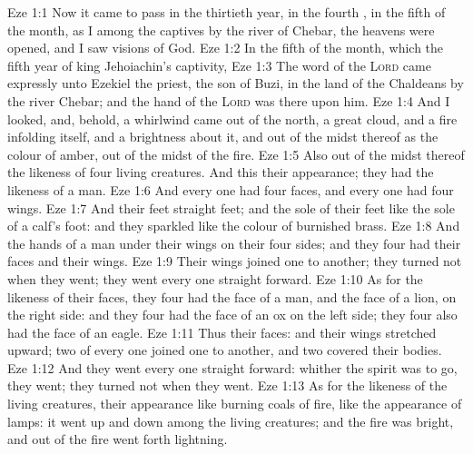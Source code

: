 \vs Eze 1:1 Now it came to pass in the thirtieth year, in the fourth , in the fifth  of the month, as I  among the captives by the river of Chebar,  the heavens were opened, and I saw visions of God.
\vs Eze 1:2 In the fifth  of the month, which  the fifth year of king Jehoiachin's captivity,
\vs Eze 1:3 The word of the \textsc{Lord} came expressly unto Ezekiel the priest, the son of Buzi, in the land of the Chaldeans by the river Chebar; and the hand of the \textsc{Lord} was there upon him.
\vs Eze 1:4 And I looked, and, behold, a whirlwind came out of the north, a great cloud, and a fire infolding itself, and a brightness  about it, and out of the midst thereof as the colour of amber, out of the midst of the fire.
\vs Eze 1:5 Also out of the midst thereof  the likeness of four living creatures. And this  their appearance; they had the likeness of a man.
\vs Eze 1:6 And every one had four faces, and every one had four wings.
\vs Eze 1:7 And their feet  straight feet; and the sole of their feet  like the sole of a calf's foot: and they sparkled like the colour of burnished brass.
\vs Eze 1:8 And  the hands of a man under their wings on their four sides; and they four had their faces and their wings.
\vs Eze 1:9 Their wings  joined one to another; they turned not when they went; they went every one straight forward.
\vs Eze 1:10 As for the likeness of their faces, they four had the face of a man, and the face of a lion, on the right side: and they four had the face of an ox on the left side; they four also had the face of an eagle.
\vs Eze 1:11 Thus  their faces: and their wings  stretched upward; two  of every one  joined one to another, and two covered their bodies.
\vs Eze 1:12 And they went every one straight forward: whither the spirit was to go, they went;  they turned not when they went.
\vs Eze 1:13 As for the likeness of the living creatures, their appearance  like burning coals of fire,  like the appearance of lamps: it went up and down among the living creatures; and the fire was bright, and out of the fire went forth lightning.
